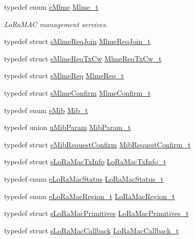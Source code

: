 \begin{DoxyCompactItemize}
typedef enum \hyperlink{group__LORAMAC_ga320f4c08fe99747b08463689be624f7b}{e\+Mlme} \hyperlink{group__LORAMAC_ga663544b83d50ec3518608be495896809}{Mlme\+\_\+t}
\begin{DoxyCompactList}\small\item\em Lo\+Ra\+M\+AC management services. \end{DoxyCompactList}\item 
typedef struct \hyperlink{structsMlmeReqJoin}{s\+Mlme\+Req\+Join} \hyperlink{group__LORAMAC_gab12f7f7d9bdfb8067d56f7c9f1297d95}{Mlme\+Req\+Join\+\_\+t}
\item 
typedef struct \hyperlink{structsMlmeReqTxCw}{s\+Mlme\+Req\+Tx\+Cw} \hyperlink{group__LORAMAC_gab71a9931686ff623fa01ceecc61f1986}{Mlme\+Req\+Tx\+Cw\+\_\+t}
\item 
typedef struct \hyperlink{structsMlmeReq}{s\+Mlme\+Req} \hyperlink{group__LORAMAC_ga5a32f5920a7a3d04435c142be7f38b19}{Mlme\+Req\+\_\+t}
\item 
typedef struct \hyperlink{structsMlmeConfirm}{s\+Mlme\+Confirm} \hyperlink{group__LORAMAC_ga73d9d9e11e282a6c258c4d22865fe824}{Mlme\+Confirm\+\_\+t}
\item 
typedef enum \hyperlink{group__LORAMAC_ga32ea83d13a3f5bb4b3ec2ace2319ab61}{e\+Mib} \hyperlink{group__LORAMAC_gaf17bd3de9ec75e4954be9a070cd8ddf9}{Mib\+\_\+t}
\item 
typedef union \hyperlink{unionuMibParam}{u\+Mib\+Param} \hyperlink{group__LORAMAC_gae9f2411f44447849f5b36bcaca1feb5c}{Mib\+Param\+\_\+t}
\item 
typedef struct \hyperlink{structeMibRequestConfirm}{e\+Mib\+Request\+Confirm} \hyperlink{group__LORAMAC_ga9269d5ae88dd157a58e9d60f680d63f0}{Mib\+Request\+Confirm\+\_\+t}
\item 
typedef struct \hyperlink{structsLoRaMacTxInfo}{s\+Lo\+Ra\+Mac\+Tx\+Info} \hyperlink{group__LORAMAC_ga3219fea2f3c3355f80d2ed29db613683}{Lo\+Ra\+Mac\+Tx\+Info\+\_\+t}
\item 
typedef enum \hyperlink{group__LORAMAC_ga1d18f26b344040b3ec5c3db662919661}{e\+Lo\+Ra\+Mac\+Status} \hyperlink{group__LORAMAC_ga30bd25657e10480f8605ee951b0ecfbd}{Lo\+Ra\+Mac\+Status\+\_\+t}
\item 
typedef enum \hyperlink{group__LORAMAC_ga5d863ec55bc300e0ffeef88bcbeb70af}{e\+Lo\+Ra\+Mac\+Region\+\_\+t} \hyperlink{group__LORAMAC_ga80c48efda9ae02e14b58160d34a798dd}{Lo\+Ra\+Mac\+Region\+\_\+t}
\item 
typedef struct \hyperlink{structsLoRaMacPrimitives}{s\+Lo\+Ra\+Mac\+Primitives} \hyperlink{group__LORAMAC_gafc0443f59f49d8597c0accb5e6074c44}{Lo\+Ra\+Mac\+Primitives\+\_\+t}
\item 
typedef struct \hyperlink{structsLoRaMacCallback}{s\+Lo\+Ra\+Mac\+Callback} \hyperlink{group__LORAMAC_ga2899a8ebbefe08452ddf89e14159a160}{Lo\+Ra\+Mac\+Callback\+\_\+t}
\end{DoxyCompactItemize}
